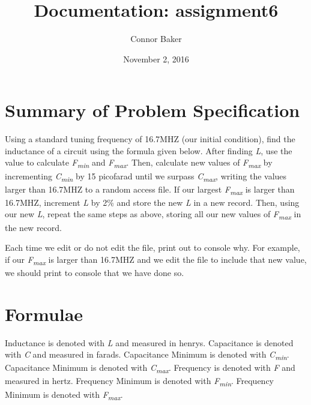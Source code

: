 \documentclass[12pt]{article}
\begin{document}
\null  %
\nointerlineskip  %
\vfill
\let \snewpage \newpage
\let \newpage \relax
    \title{Documentation: assignment6}
    \author{Connor Baker}
    \date{November 2, 2016}
\maketitle
\let \newpage \snewpage
\vfill

\newpage %

\section*{Summary of Problem Specification}
    Using a standard tuning frequency of 16.7MHZ (our initial condition), find the inductance of a circuit using the formula given below. After finding \textit{L}, use the value to calculate \textit{F\textsubscript{min}} and \textit{F\textsubscript{max}}. Then, calculate new values of \textit{F\textsubscript{max}} by incrementing \textit{C\textsubscript{min}} by 15 picofarad until we surpass \textit{C\textsubscript{max}}, writing the values larger than 16.7MHZ to a random access file. If our largest \textit{F\textsubscript{max}} is larger than 16.7MHZ, increment \textit{L} by 2\% and store the new \textit{L} in a new record. Then, using our new \textit{L}, repeat the same steps as above, storing all our new values of \textit{F\textsubscript{max}} in the new record.

    \par %
    Each time we edit or do not edit the file, print out to console why. For example, if our \textit{F\textsubscript{max}} is larger than 16.7MHZ and we edit the file to include that new value, we should print to console that we have done so.

\section*{Formulae}
    Inductance is denoted with \textit{L} and measured in henrys.
    Capacitance is denoted with \textit{C} and measured in farads.
    Capacitance Minimum is denoted with \textit{C\textsubscript{min}}.
    Capacitance Minimum is denoted with \textit{C\textsubscript{max}}.
    Frequency is denoted with \textit{F} and measured in hertz.
    Frequency Minimum is denoted with \textit{F\textsubscript{min}}.
    Frequency Minimum is denoted with \textit{F\textsubscript{max}}.
\end{document}
